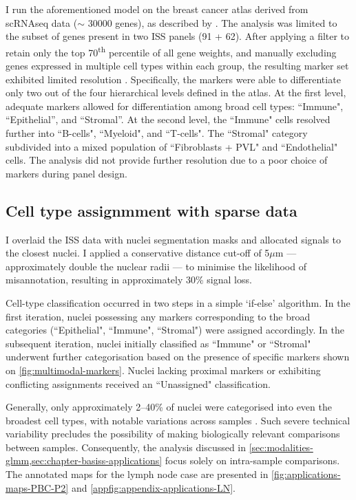 I run the aforementioned model on the breast cancer atlas derived from \ac{scRNAseq} data ($\sim$ 30000 genes), as described by \textcite{Wu2021-uq}. The analysis was limited to the subset of genes present in two \ac{ISS} panels (91 + 62). After applying a filter to retain only the top 70\textsuperscript{th} percentile of all gene weights, and manually excluding genes expressed in multiple cell types within each group, the resulting marker set exhibited limited resolution . Specifically, the markers were able to differentiate only two out of the four hierarchical levels defined in the atlas. At the first level, adequate markers allowed for differentiation among broad cell types: ``Immune", ``Epithelial'', and ``Stromal''. At the second level, the ``Immune" cells resolved further into ``B-cells", ``Myeloid", and ``T-cells". The ``Stromal" category subdivided into a mixed population of ``Fibroblasts + PVL" and ``Endothelial" cells. The analysis did not provide further resolution due to a poor choice of markers during panel design.

\subsection{Cell type assignmment with sparse data}
\label{sec:modalities-celltype}

I overlaid the \ac{ISS} data with nuclei segmentation masks and allocated signals to the closest nuclei. I applied a conservative distance cut-off of 5$\mu$m — approximately double the nuclear radii — to minimise the likelihood of misannotation, resulting in approximately 30\% signal loss.

Cell-type classification occurred in two steps in a simple `if-else' algorithm. In the first iteration, nuclei possessing any markers corresponding to the broad categories (``Epithelial", ``Immune", ``Stromal") were assigned accordingly. In the subsequent iteration, nuclei initially classified as ``Immune" or ``Stromal" underwent further categorisation based on the presence of specific markers shown on \cref{fig:multimodal-markers}. Nuclei lacking proximal markers or exhibiting conflicting assignments received an ``Unassigned" classification. 

Generally, only approximately 2--40\% of nuclei were categorised into even the broadest cell types, with notable variations across samples . Such severe technical variability precludes the possibility of making biologically relevant comparisons between samples. Consequently, the analysis discussed in \cref{sec:modalities-glmm,sec:chapter-basiss-applications} focus solely on intra-sample comparisons. The annotated maps for the lymph node case are presented in \cref{fig:applications-maps-PBC-P2} and \cref{appfig:appendix-applications-LN}.

